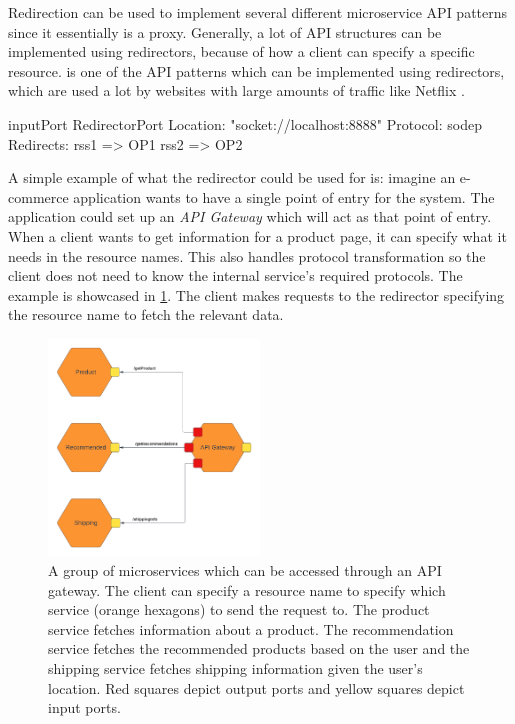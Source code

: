 Redirection can be used to implement several different microservice API patterns since it essentially is a proxy.
Generally, a lot of API structures can be implemented using redirectors, because of how a client can specify a specific resource.
 is one of the API patterns which can be implemented using redirectors, which are used a lot by websites with large amounts of traffic like Netflix \cite{optimizingnetflix}.

\begin{jolisting}[][caption={Input port which redirects requests using resource names}, label=lst:redirector-inputport]
inputPort RedirectorPort {
    Location: "socket://localhost:8888"
    Protocol: sodep
    Redirects:
        rss1 => OP1
        rss2 => OP2
}
\end{jolisting}

A simple example of what the redirector could be used for is: imagine an e-commerce application wants to have a single point of entry for the system. The application could set up an \emph{API Gateway} which will act as that point of entry. 
When a client wants to get information for a product page, it can specify what it needs in the resource names. This also handles protocol transformation so the client does not need to know the internal service's required protocols.
The example is showcased in \cref{figure:redirector_example}. The client makes requests to the redirector specifying the resource name to fetch the relevant data.
\begin{figure}[h!]
    \center
    \includegraphics[width=0.5\textwidth]{figures/redirector_example.png}
    \caption{A group of microservices which can be accessed through an API gateway. 
    The client can specify a resource name to specify which service (orange hexagons) to send the request to.
    The product service fetches information about a product. The recommendation service fetches
    the recommended products based on the user and the shipping service fetches shipping information given the user's location.
    Red squares depict output ports and yellow squares depict input ports.}
    \label{figure:redirector_example}
\end{figure}


